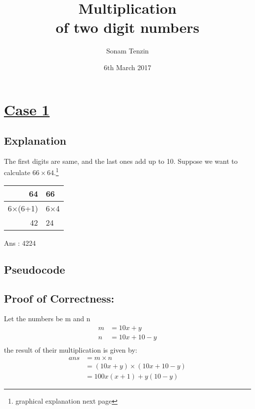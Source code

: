 \documentclass[11pt, a4paper]{article}
\title{Multiplication \\of two digit numbers}
\author{Sonam Tenzin}
\date{6th March 2017}
\begin{document}
	\maketitle
	\newpage
	\section{\underline{Case 1}}
	\subsection{Explanation}
	The first digits are same, and the last ones add up to 10.
	Suppose we want to calculate $66 \times 64$.\footnote{graphical explanation next page}\\

	{\begin{center}
	\begin{tabular}{rl}
		64 & 66\\
		\hline
		 6$\times$(6+1) & 6$\times$4\\
		 42 & 24\\
		 
	\end{tabular}
	\end{center}}
	Ans : 4224
		
	\subsection{Pseudocode}\label{B1}
	\begin{algorithm}
		{}
	\end{algorithm}
		
	\subsection{Proof of Correctness:\label{C1}\\}
	Let the numbers be m and n
	\begin{align*}
		m &= 10x+y\\%
		n &= 10x+10-y\\%
	\end{align*}
	the result of their multiplication is given by:\\
	\begin{align*}
		ans &= m \times n\\
				&= (10x+y) \times (10x +10-y)\\
				&= 100x(x+1) + y(10-y) 
	\end{align*}
	
	
\end{document}
